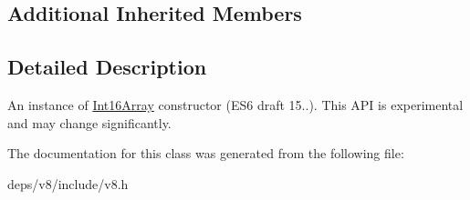 \subsection*{Additional Inherited Members}


\subsection{Detailed Description}
An instance of \hyperlink{classv8_1_1_int16_array}{Int16\+Array} constructor (E\+S6 draft 15..). This A\+P\+I is experimental and may change significantly. 

The documentation for this class was generated from the following file\+:\begin{DoxyCompactItemize}
\item 
deps/v8/include/v8.\+h\end{DoxyCompactItemize}
